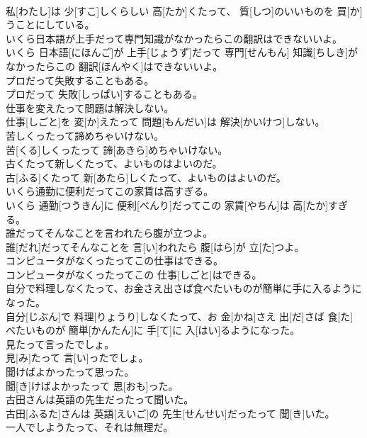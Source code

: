 \documentclass[8pt]{extreport}
\begin{document}
\begin{CJK}{UTF8}{min}
\\	私[わたし]は 少[すこ]しくらしい 高[たか]くたって、 質[しつ]のいいものを 買[か]うことにしている。
\\	いくら日本語が上手だって専門知識がなかったらこの翻訳はできないいよ。	
\\	いくら 日本語[にほんご]が 上手[じょうず]だって 専門[せんもん] 知識[ちしき]がなかったらこの 翻訳[ほんやく]はできないいよ。
\\	プロだって失敗することもある。	
\\	プロだって 失敗[しっぱい]することもある。
\\	仕事を変えたって問題は解決しない。	
\\	仕事[しごと]を 変[か]えたって 問題[もんだい]は 解決[かいけつ]しない。
\\	苦しくったって諦めちゃいけない。	
\\	苦[くる]しくったって 諦[あきら]めちゃいけない。
\\	古くたって新しくたって、よいものはよいのだ。	
\\	古[ふる]くたって 新[あたら]しくたって、よいものはよいのだ。
\\	いくら通勤に便利だってこの家賃は高すぎる。	
\\	いくら 通勤[つうきん]に 便利[べんり]だってこの 家賃[やちん]は 高[たか]すぎる。
\\	誰だってそんなことを言われたら腹が立つよ。	
\\	誰[だれ]だってそんなことを 言[い]われたら 腹[はら]が 立[た]つよ。
\\	コンピュータがなくったってこの仕事はできる。	
\\	コンピュータがなくったってこの 仕事[しごと]はできる。
\\	自分で料理しなくたって、お金さえ出さば食べたいものが簡単に手に入るようになった。	
\\	自分[じぶん]で 料理[りょうり]しなくたって、お 金[かね]さえ 出[だ]さば 食[た]べたいものが 簡単[かんたん]に 手[て]に 入[はい]るようになった。
\\	見たって言ったでしょ。	
\\	見[み]たって 言[い]ったでしょ。
\\	聞けばよかったって思った。	
\\	聞[き]けばよかったって 思[おも]った。
\\	古田さんは英語の先生だったって聞いた。	
\\	古田[ふるた]さんは 英語[えいご]の 先生[せんせい]だったって 聞[き]いた。
\\	一人でしようたって、それは無理だ。	

\end{CJK}
\end{document}
